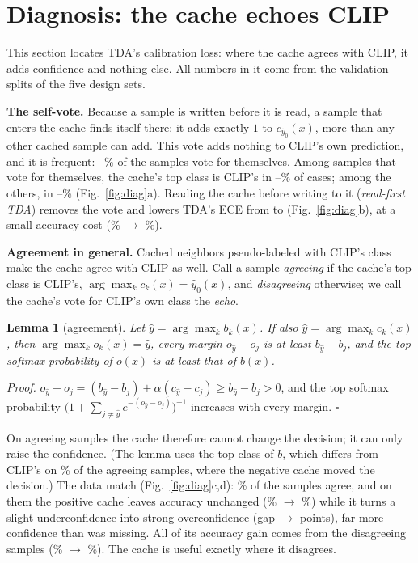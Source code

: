 \documentclass[10pt]{article}
\newtheorem{lemma}{Lemma}
\begin{document}
\section{Diagnosis: the cache echoes CLIP}\label{sec:motivation}
This section locates TDA's calibration loss: where the cache agrees with CLIP, it adds confidence and nothing else. All
numbers in it come from the validation splits of the five design sets.

\textbf{The self-vote.} Because a sample is written before it is read, a sample that enters the cache finds itself
there: it adds exactly $1$ to $c_{\hat y_0}(x)$, more than any other cached sample can add. This vote adds nothing to
CLIP's own prediction, and it is frequent: \valSelfMin--\valSelfMax\% of the samples vote for themselves. Among samples
that vote for themselves, the cache's top class is CLIP's in \valAgreeSelfMin--\valAgreeSelfMax\% of cases; among the
others, in \valAgreeNoSelfMin--\valAgreeNoSelfMax\% (Fig.~\ref{fig:diag}a). Reading the cache before writing to it
(\emph{read-first TDA}) removes the vote and lowers TDA's ECE from \valTdaEce{} to \valNoSelfEce{}
(Fig.~\ref{fig:diag}b), at a small accuracy cost (\valTdaAcc\% $\to$ \valNoSelfAcc\%).

\textbf{Agreement in general.} Cached neighbors pseudo-labeled with CLIP's class make the cache agree with CLIP as well.
Call a sample \emph{agreeing} if the cache's top class is CLIP's, $\arg\max_k c_k(x) = \hat y_0(x)$, and
\emph{disagreeing} otherwise; we call the cache's vote for CLIP's own class the \emph{echo}.

\begin{lemma}[agreement]\label{lem:agree}
Let $\hat y = \arg\max_k b_k(x)$. If also $\hat y = \arg\max_k c_k(x)$, then $\arg\max_k o_k(x) = \hat y$, every margin
$o_{\hat y} - o_j$ is at least $b_{\hat y} - b_j$, and the top softmax probability of $o(x)$ is at least that of $b(x)$.
\end{lemma}
\noindent\emph{Proof.} $o_{\hat y} - o_j = (b_{\hat y} - b_j) + \alpha(c_{\hat y} - c_j) \ge b_{\hat y} - b_j > 0$, and
the top softmax probability $\big(1 + \sum_{j \ne \hat y} e^{-(o_{\hat y}-o_j)}\big)^{-1}$ increases with every margin.
$\square$

On agreeing samples the cache therefore cannot change the decision; it can only raise the confidence. (The lemma uses
the top class of $b$, which differs from CLIP's on \valAgreeNegMoved\% of the agreeing samples, where the negative cache
moved the decision.) The data match (Fig.~\ref{fig:diag}c,d): \valAgreeShare\% of the samples agree, and on them the
positive cache leaves accuracy unchanged (\valAgreeBaseAcc\% $\to$ \valAgreeTdaAcc\%) while it turns a slight
underconfidence into strong overconfidence (gap \valAgreeBaseGap{} $\to$ \valAgreeTdaGap{} points), far more confidence
than was missing. All of its accuracy gain comes from the disagreeing samples (\valDisagreeBaseAcc\% $\to$
\valDisagreeTdaAcc\%). The cache is useful exactly where it disagrees.
\end{document}
